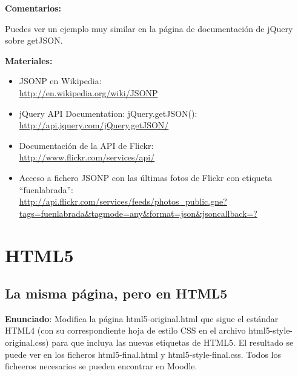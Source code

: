 \textbf{Comentarios:}

Puedes ver un ejemplo muy similar en la página de documentación de jQuery sobre getJSON.

\textbf{Materiales:}

\begin{itemize}
\item JSONP en Wikipedia: \\
  \url{http://en.wikipedia.org/wiki/JSONP}
\item jQuery API Documentation: jQuery.getJSON(): \\
  \url{http://api.jquery.com/jQuery.getJSON/}
\item Documentación de la API de Flickr: \\
  \url{http://www.flickr.com/services/api/}
\item Acceso a fichero JSONP con las últimas fotos de Flickr con etiqueta ``fuenlabrada'': \\
  \url{http://api.flickr.com/services/feeds/photos_public.gne?tags=fuenlabrada&tagmode=any&format=json&jsoncallback=?}
\end{itemize}


\section{HTML5}

\subsection{La misma página, pero en HTML5}
\label{subsec:lo-mismo-pero-diferente}

\textbf{Enunciado}: Modifica la página html5-original.html que sigue el estándar HTML4
(con su correspondiente hoja de estilo CSS en el archivo html5-style-original.css)
para que incluya las nuevas etiquetas de HTML5. El resultado se puede ver en los
ficheros html5-final.html y html5-style-final.css. Todos los ficheeros necesarios se
pueden encontrar en Moodle.

